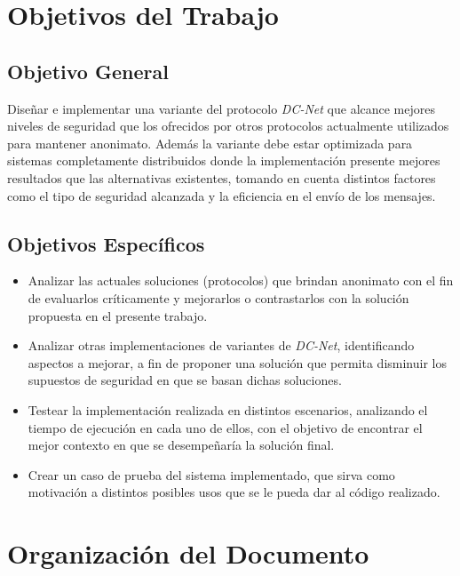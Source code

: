 \section{Objetivos del Trabajo}

\subsection{Objetivo General}

Diseñar e implementar una variante del protocolo \emph{DC-Net} que alcance mejores niveles de seguridad que los ofrecidos por otros protocolos 
actualmente utilizados para mantener anonimato. Además la variante debe estar optimizada para sistemas completamente distribuidos donde la implementación presente mejores resultados que las 
alternativas existentes, tomando en cuenta distintos factores como el tipo de seguridad alcanzada y la eficiencia en el envío de los mensajes.

\subsection{Objetivos Específicos}

\begin{itemize}
    \item Analizar las actuales soluciones (protocolos) que brindan anonimato con el fin de evaluarlos críticamente y mejorarlos o contrastarlos con la solución propuesta en el presente trabajo.
    \item Analizar otras implementaciones de variantes de \emph{DC-Net}, identificando aspectos a mejorar, a fin de proponer una solución que permita disminuir los supuestos de 
    seguridad en que se basan dichas soluciones.
    \item Testear la implementación realizada en distintos escenarios, analizando el tiempo de ejecución en cada uno de ellos, con el objetivo 
    de encontrar el mejor contexto en que se desempeñaría la solución final.
    \item Crear un caso de prueba del sistema implementado, que sirva como motivación a distintos posibles usos que se le pueda dar al código realizado.
\end{itemize}

\section{Organización del Documento}

